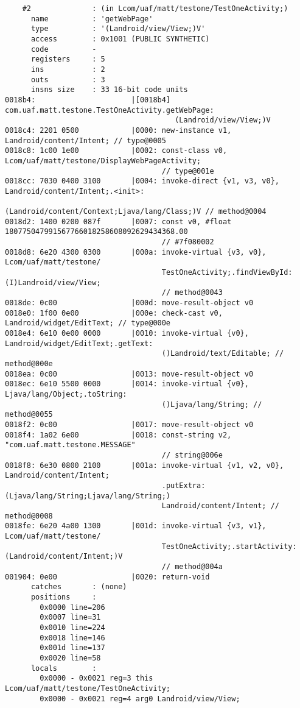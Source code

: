 \begin{lstlisting}
    #2              : (in Lcom/uaf/matt/testone/TestOneActivity;)
      name          : 'getWebPage'
      type          : '(Landroid/view/View;)V'
      access        : 0x1001 (PUBLIC SYNTHETIC)
      code          -
      registers     : 5
      ins           : 2
      outs          : 3
      insns size    : 33 16-bit code units
0018b4:                      |[0018b4] com.uaf.matt.testone.TestOneActivity.getWebPage:
                                       (Landroid/view/View;)V
0018c4: 2201 0500            |0000: new-instance v1, Landroid/content/Intent; // type@0005
0018c8: 1c00 1e00            |0002: const-class v0, Lcom/uaf/matt/testone/DisplayWebPageActivity;
                                    // type@001e
0018cc: 7030 0400 3100       |0004: invoke-direct {v1, v3, v0}, Landroid/content/Intent;.<init>:
                                    (Landroid/content/Context;Ljava/lang/Class;)V // method@0004
0018d2: 1400 0200 087f       |0007: const v0, #float 180775047991567766018258608092629434368.00
                                    // #7f080002
0018d8: 6e20 4300 0300       |000a: invoke-virtual {v3, v0}, Lcom/uaf/matt/testone/
                                    TestOneActivity;.findViewById:(I)Landroid/view/View;
                                    // method@0043
0018de: 0c00                 |000d: move-result-object v0
0018e0: 1f00 0e00            |000e: check-cast v0, Landroid/widget/EditText; // type@000e
0018e4: 6e10 0e00 0000       |0010: invoke-virtual {v0}, Landroid/widget/EditText;.getText:
                                    ()Landroid/text/Editable; // method@000e
0018ea: 0c00                 |0013: move-result-object v0
0018ec: 6e10 5500 0000       |0014: invoke-virtual {v0}, Ljava/lang/Object;.toString:
                                    ()Ljava/lang/String; // method@0055
0018f2: 0c00                 |0017: move-result-object v0
0018f4: 1a02 6e00            |0018: const-string v2, "com.uaf.matt.testone.MESSAGE"
                                    // string@006e
0018f8: 6e30 0800 2100       |001a: invoke-virtual {v1, v2, v0}, Landroid/content/Intent;
                                    .putExtra:(Ljava/lang/String;Ljava/lang/String;)
                                    Landroid/content/Intent; // method@0008
0018fe: 6e20 4a00 1300       |001d: invoke-virtual {v3, v1}, Lcom/uaf/matt/testone/
                                    TestOneActivity;.startActivity:(Landroid/content/Intent;)V
                                    // method@004a
001904: 0e00                 |0020: return-void
      catches       : (none)
      positions     :
        0x0000 line=206
        0x0007 line=31
        0x0010 line=224
        0x0018 line=146
        0x001d line=137
        0x0020 line=58
      locals        :
        0x0000 - 0x0021 reg=3 this Lcom/uaf/matt/testone/TestOneActivity;
        0x0000 - 0x0021 reg=4 arg0 Landroid/view/View;


\end{lstlisting}

